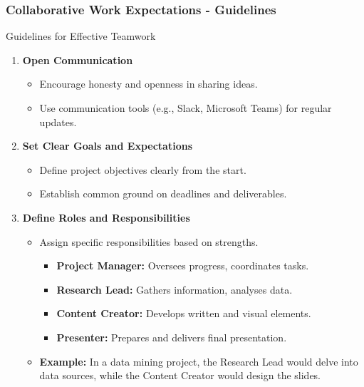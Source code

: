 \documentclass[aspectratio=169]{beamer}
\begin{document}
\begin{frame}[fragile]
    \frametitle{Collaborative Work Expectations - Guidelines}
    \begin{block}{Guidelines for Effective Teamwork}
        \begin{enumerate}
            \item \textbf{Open Communication}
                \begin{itemize}
                    \item Encourage honesty and openness in sharing ideas.
                    \item Use communication tools (e.g., Slack, Microsoft Teams) for regular updates.
                \end{itemize}
            \item \textbf{Set Clear Goals and Expectations}
                \begin{itemize}
                    \item Define project objectives clearly from the start.
                    \item Establish common ground on deadlines and deliverables.
                \end{itemize}
            \item \textbf{Define Roles and Responsibilities}
                \begin{itemize}
                    \item Assign specific responsibilities based on strengths.
                    \begin{itemize}
                        \item \textbf{Project Manager:} Oversees progress, coordinates tasks.
                        \item \textbf{Research Lead:} Gathers information, analyses data.
                        \item \textbf{Content Creator:} Develops written and visual elements.
                        \item \textbf{Presenter:} Prepares and delivers final presentation.
                    \end{itemize}
                    \item \textbf{Example:} In a data mining project, the Research Lead would delve into data sources, while the Content Creator would design the slides.
                \end{itemize}
        \end{enumerate}
    \end{block}
\end{frame}
\end{document}
